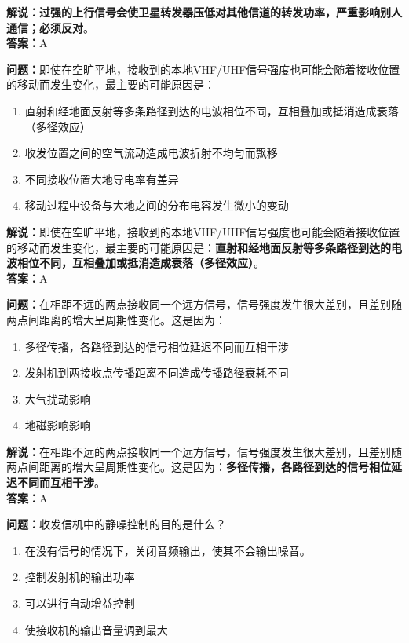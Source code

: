 \textbf{解说：过强的上行信号会使卫星转发器压低对其他信道的转发功率，严重影响别人通信；必须反对}。\\\textbf{答案：}A%


\textbf{问题：}即使在空旷平地，接收到的本地VHF/UHF信号强度也可能会随着接收位置的移动而发生变化，最主要的可能原因是：

\begin{enumerate}[label=\Alph*), leftmargin=1.5cm]
	\item 直射和经地面反射等多条路径到达的电波相位不同，互相叠加或抵消造成衰落（多径效应）
	\item 收发位置之间的空气流动造成电波折射不均匀而飘移
	\item 不同接收位置大地导电率有差异
	\item 移动过程中设备与大地之间的分布电容发生微小的变动
\end{enumerate}

\textbf{解说：}即使在空旷平地，接收到的本地VHF/UHF信号强度也可能会随着接收位置的移动而发生变化，最主要的可能原因是：\textbf{直射和经地面反射等多条路径到达的电波相位不同，互相叠加或抵消造成衰落（多径效应）}。\\\textbf{答案：}A%


\textbf{问题：}在相距不远的两点接收同一个远方信号，信号强度发生很大差别，且差别随两点间距离的增大呈周期性变化。这是因为：

\begin{enumerate}[label=\Alph*), leftmargin=1.5cm]
	\item 多径传播，各路径到达的信号相位延迟不同而互相干涉
	\item 发射机到两接收点传播距离不同造成传播路径衰耗不同
	\item 大气扰动影响
	\item 地磁影响影响
\end{enumerate}

\textbf{解说：}在相距不远的两点接收同一个远方信号，信号强度发生很大差别，且差别随两点间距离的增大呈周期性变化。这是因为：\textbf{多径传播，各路径到达的信号相位延迟不同而互相干涉}。\\\textbf{答案：}A%


\textbf{问题：}收发信机中的静噪控制的目的是什么？

\begin{enumerate}[label=\Alph*), leftmargin=1.5cm]
	\item 在没有信号的情况下，关闭音频输出，使其不会输出噪音。
	\item 控制发射机的输出功率
	\item 可以进行自动增益控制
	\item 使接收机的输出音量调到最大
\end{enumerate}

